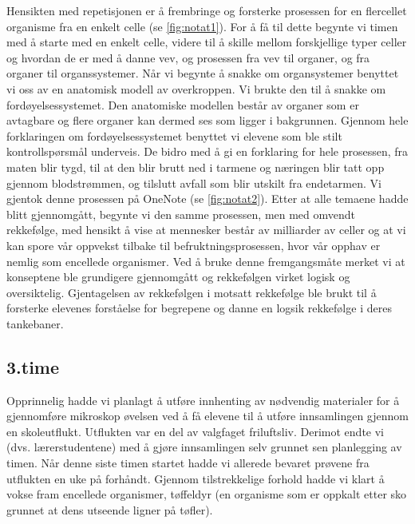 \documentclass[main.tex]{subfiles}
\begin{document}
Hensikten med repetisjonen er å frembringe og forsterke prosessen for en flercellet organisme fra 
en enkelt celle (se \ref{fig:notat1}). For å få til dette begynte vi timen med å starte med en 
enkelt celle, videre til å skille mellom forskjellige typer celler og hvordan de er med å danne 
vev, og prosessen fra vev til organer, og fra organer til organssystemer. Når vi begynte å snakke
om organsystemer benyttet vi oss av en anatomisk modell av overkroppen. Vi brukte den til å snakke 
om fordøyelsessystemet.
Den anatomiske modellen består av organer som er avtagbare og flere organer kan dermed ses som
ligger i bakgrunnen. Gjennom hele forklaringen om fordøyelsessystemet benyttet vi elevene som
ble stilt kontrollspørsmål underveis. De bidro med å gi en forklaring for hele prosessen, fra maten
blir tygd, til at den blir brutt ned i tarmene og næringen blir tatt opp gjennom blodstrømmen, og
tilslutt avfall som blir utskilt fra endetarmen. Vi gjentok denne prosessen på OneNote (se 
\ref{fig:notat2}). Etter at alle temaene hadde blitt gjennomgått, begynte vi den samme prosessen, 
men med omvendt rekkefølge, med hensikt å vise at mennesker består av milliarder av celler og 
at vi kan spore vår oppvekst tilbake til befruktningsprosessen, hvor vår opphav er nemlig som
encellede organismer. Ved å bruke denne fremgangsmåte merket vi at konseptene ble grundigere
gjennomgått og rekkefølgen virket logisk og oversiktelig. Gjentagelsen av rekkefølgen i motsatt
rekkefølge ble brukt til å forsterke elevenes forståelse for begrepene og danne en logsik 
rekkefølge i deres tankebaner.

\subsection*{3.time}
Opprinnelig hadde vi planlagt å utføre innhenting av nødvendig materialer for å gjennomføre 
mikroskop øvelsen ved å få elevene til å utføre innsamlingen gjennom en skoleutflukt. Utflukten var 
en del av valgfaget friluftsliv. Derimot endte vi (dvs. lærerstudentene) med å gjøre innsamlingen 
selv grunnet sen planlegging av timen. Når denne siste timen startet hadde vi allerede bevaret 
prøvene fra utflukten en uke på forhåndt. Gjennom tilstrekkelige forhold hadde vi klart å vokse 
fram encellede organismer, tøffeldyr (en organisme som er oppkalt etter sko grunnet at dens
utseende ligner på tøfler).
\end{document}
